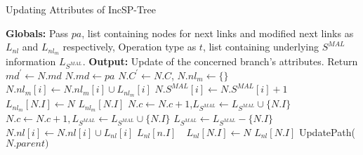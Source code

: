 \begin{algorithm}[!tb]
     \scriptsize %
    \caption{Updating Attributes of IncSP-Tree} \label{algorithm:update_inc_sp}
    \begin{algorithmic}[1]
        \State \textbf{Globals: }Pass $pa$, list containing nodes for next links and modified next links as $L_{nl}$ and $L_{nl_{m}}$ respectively, Operation type as $t$, list containing underlying $S^{MAL}$ information $L_{S^{MAL}}$.
        \State \textbf{Output: }Update of the concerned branch's attributes. 
            \State Return 
            \EndIf 
            \State $md^{\prime} \gets N.md$
             $N.md \gets pa$ 
             \State {}
                \State $N.C^{\prime} \gets N.C$, $N.nl_{m} \gets \{\}$ 
            \EndIf
                    \State {}
                    \State $N.nl_{m}[i] \gets N.nl_{m}[i] \cup L_{nl_{m}}[i]$
            \EndFor
            \State $N.S^{MAL}[i] \gets N.S^{MAL}[i]+1$ 
            \EndFor
             
                \State $L_{nl_{m}}[N.I] \gets N$ 
            \Else {}$L_{nl_{m}}[N.I]$ 
            \EndIf
            \State $N.c \gets N.c+1$,$L_{S^{MAL}} \gets L_{S^{MAL}} \cup \{N.I\}$
            \Else {}
                    \State $N.c \gets N.c+1,L_{S^{MAL}} \gets L_{S^{MAL}} \cup \{N.I\}$
                \Else {}
                    \State \text{ }$L_{S^{MAL}} \gets L_{S^{MAL}} - \{N.I\}$ 
                \EndIf
            \EndIf
             
            \State $N.nl[i] \gets N.nl[i] \cup L_{nl}[i]$ 
            \EndFor
             
                 
                    \State {}$L_{nl}[n.I]$ 
                \Else $\text{ }L_{nl}[N.I] \gets N$ 
                \EndIf
            \Else {}$L_{nl}[N.I]$ 
            \EndIf
            \State UpdatePath($N.parent)$
        \EndProcedure
    \end{algorithmic}
\end{algorithm}

